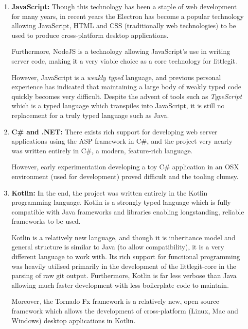 \begin{enumerate}
\item \textbf{JavaScript:} Though this technology has been a staple of web development for many years, in recent years the Electron \cite{electron} has become a popular technology allowing JavaScript, HTML and CSS (traditionally web technologies) to be used to produce cross-platform desktop applications.

Furthermore, NodeJS \cite{nodejs} is a technology allowing JavaScript's use in writing server code, making it a very viable choice as a core technology for littlegit. 

However, JavaScript is a \emph{weakly typed} language, and previous personal experience has indicated that maintaining a large body of weakly typed code quickly becomes very difficult. Despite the advent of tools such as \emph{TypeScript} which is a typed language which transpiles into JavaScript, it is still no replacement for a truly typed language such as Java.

\item \textbf{C\# and .NET:} There exists rich support for developing web server applications using the ASP \cite{asp} framework in C\#, and the project very nearly was written entirely in C\#, a modern, feature-rich language.

However, early experimentation developing a toy C\# application in an OSX environment (used for development) proved difficult and the tooling clumsy. 

\item \textbf{Kotlin:} In the end, the project was written entirely in the Kotlin programming language. Kotlin is a strongly typed language which is fully compatible with Java frameworks and libraries enabling longstanding, reliable frameworks to be used. 

Kotlin is a relatively new language, and though it is inheritance model and general structure is similar to Java (to allow compatibility), it is a very different language to work with. Its rich support for functional programming was heavily utilised primarily in the development of the littlegit-core in the parsing of raw git output. Furthermore, Kotlin is far less verbose than Java allowing much faster development with less boilerplate code to maintain.

Moreover, the Tornado Fx \cite{tornadofx} framework is a relatively new, open source framework which allows the development of cross-platform (Linux, Mac and Windows) desktop applications in Kotlin. 


\end{enumerate}



